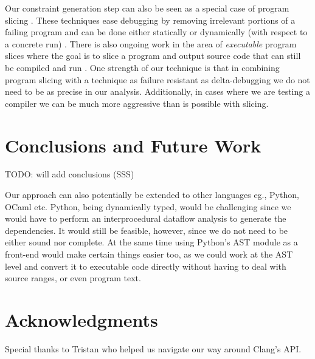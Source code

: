 \documentclass[preprint]{acm_proc_article-sp}
\begin{document}
Our constraint generation step can also be seen as a special case of program
slicing \citep{weiser81} \citep{tip94}. These techniques ease debugging by
removing irrelevant portions of a failing program and can be done either
statically or dynamically (with respect to a concrete run)
\citep{agrawal90}. There is also ongoing work in the area of \emph{executable}
program slices where the goal is to slice a program and output source code
that can still be compiled and run \citep{horwitz10}. One strength of our
technique is that in combining program slicing with a technique as failure
resistant as delta-debugging we do not need to be as precise in our
analysis. Additionally, in cases where we are testing a compiler we can be much
more aggressive than is possible with slicing.


\section{Conclusions and Future Work}
TODO: will add conclusions (SSS)

Our approach can also potentially be extended to other languages eg., Python,
OCaml etc. Python, being dynamically typed, would be challenging since we would
have to perform an interprocedural dataflow analysis to generate the
dependencies. It would still be feasible, however, since we do not need to be
either sound nor complete. At the same time using Python's AST module as a
front-end would make certain things easier too, as we could work at the AST
level and convert it to executable code directly without having to deal with
source ranges, or even program text.

\section{Acknowledgments}
Special thanks to Tristan who helped us navigate our way around Clang's API.



\end{document}
